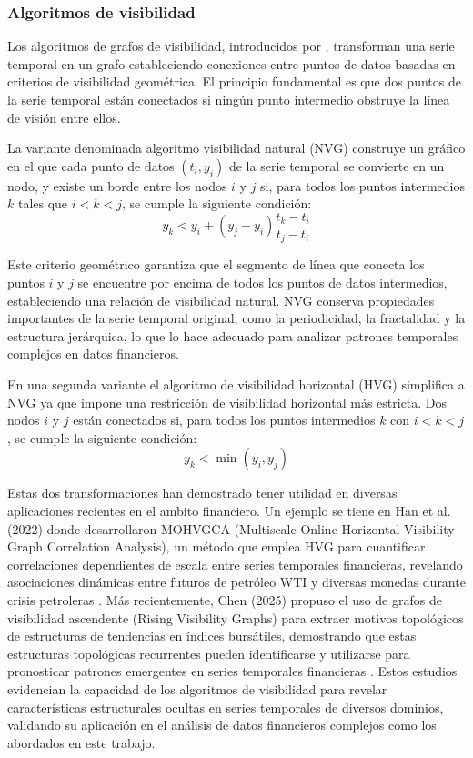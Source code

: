 \documentclass[11pt,a4paper]{article}
\begin{document}
\subsubsection{Algoritmos de visibilidad}

Los algoritmos de grafos de visibilidad, introducidos por \citep{lacasa2008visibility}, transforman una serie temporal en un grafo estableciendo conexiones entre puntos de datos basadas en criterios de visibilidad geométrica. El principio fundamental es que dos puntos de la serie temporal están conectados si ningún punto intermedio obstruye la línea de visión entre ellos.

La variante denominada algoritmo visibilidad natural (NVG) construye un gráfico en el que cada punto de datos $(t_i, y_i)$ de la serie temporal se convierte en un nodo, y existe un borde entre los nodos $i$ y $j$ si, para todos los puntos intermedios $k$ tales que $i < k < j$, se cumple la siguiente condición:
\begin{equation}
y_k < y_i + (y_j - y_i) \frac{t_k - t_i}{t_j - t_i}
\end{equation}

Este criterio geométrico garantiza que el segmento de línea que conecta los puntos $i$ y $j$ se encuentre por encima de todos los puntos de datos intermedios, estableciendo una relación de visibilidad natural. NVG conserva propiedades importantes de la serie temporal original, como la periodicidad, la fractalidad y la estructura jerárquica, lo que lo hace adecuado para analizar patrones temporales complejos en datos financieros.

En una segunda variante el algoritmo de visibilidad horizontal (HVG) \citep{luque2009horizontal} simplifica a NVG ya que impone una restricción de visibilidad horizontal más estricta. Dos nodos $i$ y $j$ están conectados si, para todos los puntos intermedios $k$ con $i < k < j$, se cumple la siguiente condición:
\begin{equation}
y_k < \min(y_i, y_j)
\end{equation}

Estas dos transformaciones han demostrado tener utilidad en diversas aplicaciones recientes en el ambito financiero. Un ejemplo se tiene en Han et al. (2022) donde desarrollaron MOHVGCA (Multiscale Online-Horizontal-Visibility-Graph Correlation Analysis), un método que emplea HVG para cuantificar correlaciones dependientes de escala entre series temporales financieras, revelando asociaciones dinámicas entre futuros de petróleo WTI y diversas monedas durante crisis petroleras \citep{han2022multiscale}.  Más recientemente, Chen (2025) propuso el uso de grafos de visibilidad ascendente (Rising Visibility Graphs) para extraer motivos topológicos de estructuras de tendencias en índices bursátiles, demostrando que estas estructuras topológicas recurrentes pueden identificarse y utilizarse para pronosticar patrones emergentes en series temporales financieras \citep{chen2025identifying}. Estos estudios evidencian la capacidad de los algoritmos de visibilidad para revelar características estructurales ocultas en series temporales de diversos dominios, validando su aplicación en el análisis de datos financieros complejos como los abordados en este trabajo.
\end{document}
